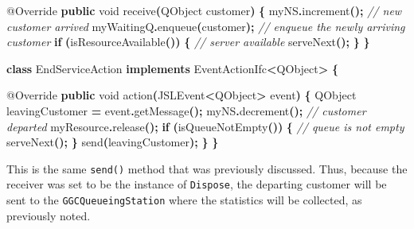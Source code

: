 \documentclass[
]{book}
\newenvironment{Shaded}{\begin{snugshade}}{\end{snugshade}}
\newcommand{\AttributeTok}[1]{\textcolor[rgb]{0.77,0.63,0.00}{#1}}
\newcommand{\CommentTok}[1]{\textcolor[rgb]{0.56,0.35,0.01}{\textit{#1}}}
\newcommand{\ControlFlowTok}[1]{\textcolor[rgb]{0.13,0.29,0.53}{\textbf{#1}}}
\newcommand{\DataTypeTok}[1]{\textcolor[rgb]{0.13,0.29,0.53}{#1}}
\newcommand{\FunctionTok}[1]{\textcolor[rgb]{0.00,0.00,0.00}{#1}}
\newcommand{\KeywordTok}[1]{\textcolor[rgb]{0.13,0.29,0.53}{\textbf{#1}}}
\newcommand{\NormalTok}[1]{#1}
\newcommand{\OperatorTok}[1]{\textcolor[rgb]{0.81,0.36,0.00}{\textbf{#1}}}
\theoremstyle{definition}
\theoremstyle{definition}
\theoremstyle{definition}
\theoremstyle{definition}
\theoremstyle{remark}
\begin{document}
\begin{Shaded}
\begin{Highlighting}[]
    \AttributeTok{@Override}
    \KeywordTok{public} \DataTypeTok{void} \FunctionTok{receive}\OperatorTok{(}\NormalTok{QObject customer}\OperatorTok{)} \OperatorTok{\{}
\NormalTok{        myNS}\OperatorTok{.}\FunctionTok{increment}\OperatorTok{();} \CommentTok{// new customer arrived}
\NormalTok{        myWaitingQ}\OperatorTok{.}\FunctionTok{enqueue}\OperatorTok{(}\NormalTok{customer}\OperatorTok{);} \CommentTok{// enqueue the newly arriving customer}
        \ControlFlowTok{if} \OperatorTok{(}\FunctionTok{isResourceAvailable}\OperatorTok{())} \OperatorTok{\{} \CommentTok{// server available}
            \FunctionTok{serveNext}\OperatorTok{();}
        \OperatorTok{\}}
    \OperatorTok{\}}

    \KeywordTok{class}\NormalTok{ EndServiceAction }\KeywordTok{implements}\NormalTok{ EventActionIfc}\OperatorTok{\textless{}}\NormalTok{QObject}\OperatorTok{\textgreater{}} \OperatorTok{\{}

        \AttributeTok{@Override}
        \KeywordTok{public} \DataTypeTok{void} \FunctionTok{action}\OperatorTok{(}\NormalTok{JSLEvent}\OperatorTok{\textless{}}\NormalTok{QObject}\OperatorTok{\textgreater{}}\NormalTok{ event}\OperatorTok{)} \OperatorTok{\{}
\NormalTok{            QObject leavingCustomer }\OperatorTok{=}\NormalTok{ event}\OperatorTok{.}\FunctionTok{getMessage}\OperatorTok{();}
\NormalTok{            myNS}\OperatorTok{.}\FunctionTok{decrement}\OperatorTok{();} \CommentTok{// customer departed}
\NormalTok{            myResource}\OperatorTok{.}\FunctionTok{release}\OperatorTok{();}
            \ControlFlowTok{if} \OperatorTok{(}\FunctionTok{isQueueNotEmpty}\OperatorTok{())} \OperatorTok{\{} \CommentTok{// queue is not empty}
                \FunctionTok{serveNext}\OperatorTok{();}
            \OperatorTok{\}}
            \FunctionTok{send}\OperatorTok{(}\NormalTok{leavingCustomer}\OperatorTok{);}
        \OperatorTok{\}}
    \OperatorTok{\}}
\end{Highlighting}
\end{Shaded}

This is the same \texttt{send()} method that was previously discussed. Thus, because the receiver was set to be
the instance of \texttt{Dispose}, the departing customer will be sent to the
\texttt{GGCQueueingStation} where the statistics will be collected, as previously
noted.
\end{document}
